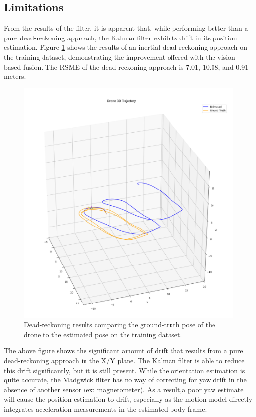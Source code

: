 \documentclass[bare_jrnl_transmag]{subfiles}
\begin{document}
\subsection{Limitations}
From the results of the filter, it is apparent that, while performing better than a pure dead-reckoning approach, the Kalman filter exhibits drift in its position estimation. Figure \ref{fig:dead_reackoning} shows the results of an inertial dead-reckoning approach on the training dataset, demonstrating the improvement offered with the vision-based fusion. The RSME of the dead-reckoning approach is 7.01, 10.08, and 0.91 meters.

\begin{figure}[H]
    \centering
    \includegraphics[width=0.8\linewidth]{figures/dead_reckoning_results_training.png}
    \caption{Dead-reckoning results comparing the ground-truth pose of the drone to the estimated pose on the training dataset.}
    \label{fig:dead_reackoning}
\end{figure}

The above figure shows the significant amount of drift that results from a pure dead-reckoning approach in the X/Y plane. The Kalman filter is able to reduce this drift significantly, but it is still present. While the orientation estimation is quite accurate, the Madgwick filter has no way of correcting for yaw drift in the absence of another sensor (ex: magnetometer). As a result,a poor yaw estimate will cause the position estimation to drift, especially as the motion model directly integrates acceleration measurements in the estimated body frame. 
\end{document}
